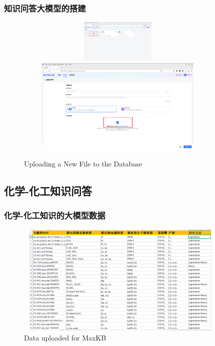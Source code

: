 \begin{frame}
	\frametitle{知识问答大模型的搭建}
\begin{figure}[h!]
\centering
\vskip -8pt
\includegraphics[height=0.80in,width=3.90in,viewport=0 650 1850 1054,clip]{Figures/MaxKB_NewDatabase.png}
\includegraphics[height=1.80in,width=3.90in,viewport=0 0 1850 880,clip]{Figures/MaxKB_Database.png}
\caption{\tiny\textrm{Uploading a New File to the Database}}%
\label{Fig:MaxKB_Database}
\end{figure}
\end{frame}

\subsection{化学-化工知识问答}
\begin{frame}
	\frametitle{化学-化工知识的大模型数据}	
\begin{figure}[h!]
\centering
\includegraphics[height=2.10in,width=4.00in,viewport=0 0 1149 636,clip]{Figures/MaxKB_Info-1.png}
\caption{\tiny\textrm{Data uploaded for MaxKB}}%
\label{Fig:MaxKB_Data-1}
\end{figure}
\end{frame}

